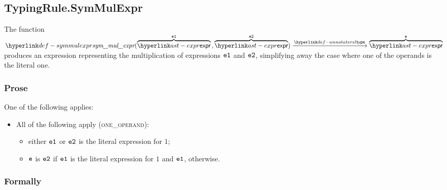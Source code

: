 \begin{mathpar}
\end{mathpar}

\subsection{TypingRule.SymMulExpr \label{sec:TypingRule.SymMulExpr}}
\hypertarget{def-symmulexpr}{}
The function
$
\symmulexpr(\overname{\expr}{\veone} \aslsep \overname{\expr}{\vetwo}) \typearrow \overname{\expr}{\ve}
$
produces an expression representing the multiplication of expressions $\veone$ and $\vetwo$,
simplifying away the case where one of the operands is the literal one.

\subsubsection{Prose}
One of the following applies:
\begin{itemize}
  \item All of the following apply (\textsc{one\_operand}):
  \begin{itemize}
    \item either $\veone$ or $\vetwo$ is the literal expression for $1$;
    \item $\ve$ is $\vetwo$ if $\veone$ is the literal expression for $1$ and $\veone$, otherwise.
  \end{itemize}
\end{itemize}

\subsubsection{Formally}

